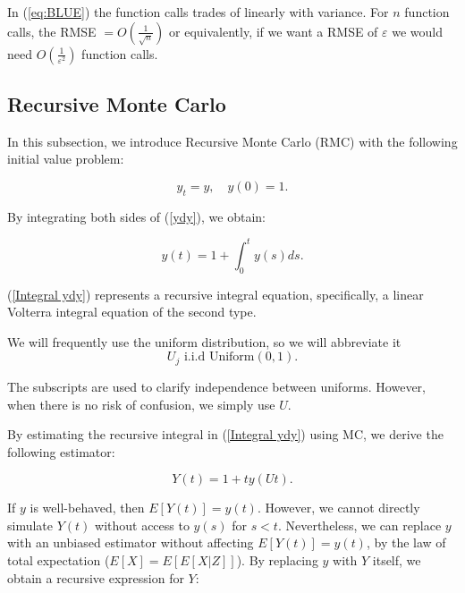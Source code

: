 \documentclass[a4paper,12pt]{article}
\begin{document}
\begin{example}
  In (\ref{eq:BLUE}) the function calls trades of
  linearly with variance. For $n$ function calls,
  the RMSE $= O\left(\frac{1}{\sqrt{n}}\right)$ or equivalently, if we want a
  RMSE of $\varepsilon$ we would need $O\left(\frac{1}{\varepsilon^{2}}\right)$
  function calls.
\end{example}


\subsection{Recursive Monte Carlo}
In this subsection, we introduce Recursive Monte Carlo (RMC)
with the following  initial value problem:


\begin{equation} \label{ydy}
  y_t = y, \quad y(0) = 1.
\end{equation}


By integrating both sides of (\ref{ydy}), we obtain:

\begin{equation} \label{Integral ydy}
  y(t) = 1 + \int_{0}^{t} y(s) ds.
\end{equation}

(\ref{Integral ydy}) represents a recursive integral equation,
specifically, a linear Volterra integral equation of the second type.

\begin{notation}[$U,U_{j}$]
  We will frequently use the uniform distribution, so we will abbreviate it
  \begin{equation}
    U_{j}  \text{ i.i.d Uniform}(0,1).
  \end{equation}

  The subscripts are used to clarify independence
  between uniforms. However,
  when there is no risk of confusion,
  we simply use $U.$
\end{notation}

By estimating the recursive integral in (\ref{Integral ydy})
using MC, we derive the following estimator:

\begin{equation}
  Y(t) = 1 + t  y(Ut).
\end{equation}


If $y$ is well-behaved, then $E[Y(t)] = y(t)$.
However, we cannot directly simulate $Y(t)$ without access
to $y(s)$ for $s < t$. Nevertheless, we can replace $y$ with
an unbiased estimator without affecting $E[Y(t)] = y(t)$,
by the law of total expectation ($E[X] = E[E[X|Z]]$).
By replacing $y$ with $Y$ itself, we obtain a recursive
expression for $Y$:
\end{document}
